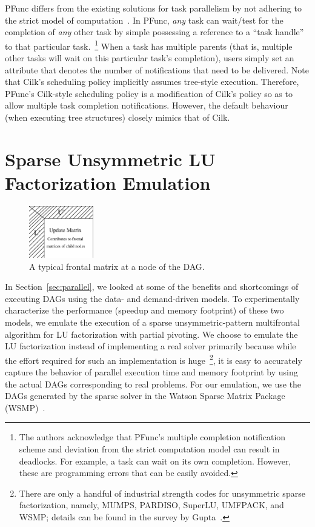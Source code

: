 \documentclass[10pt,conference]{IEEEtran}
\begin{document}
PFunc differs from the existing solutions for task parallelism by not adhering
to the strict model of computation~\cite{Blumofe94}.  In PFunc, \textit{any}
task can wait/test for the completion of \textit{any} other task by simple
possessing a reference to a ``task handle'' to that particular
task.~\footnote{The authors acknowledge that PFunc's multiple completion
notification scheme and deviation from the strict computation model can result
in deadlocks. For example, a task can wait on its own completion. However,
these are programming errors that can be easily avoided.} When a task has
multiple parents (that is, multiple other tasks will wait on this particular
task's completion), users simply set an attribute that denotes the number of
notifications that need to be delivered.  Note that Cilk's scheduling policy
implicitly assumes tree-style execution.  Therefore, PFunc's Cilk-style
scheduling policy is a modification of Cilk's policy so as to allow multiple
task completion notifications.  However, the default behaviour (when executing
tree structures) closely mimics that of Cilk.

\section{Sparse Unsymmetric LU Factorization Emulation}
\label{sec:lu}

\begin{figure}[t]
\centering
\includegraphics[width=0.25\textwidth]{figs/lu.eps}
\caption{A typical frontal matrix at a node of the DAG.}
\label{fig:lu}
\end{figure}

In Section~\ref{sec:parallel}, we looked at some of the benefits and
shortcomings of executing DAGs using the data- and demand-driven models. To
experimentally characterize the performance (speedup and memory footprint) of
these two models, we emulate the execution of a sparse unsymmetric-pattern
multifrontal algorithm for LU factorization with partial pivoting.  We choose
to emulate the LU factorization instead of implementing a real solver primarily
because while the effort required for such an implementation is 
huge~\footnote{There are only a handful of industrial strength codes for
unsymmetric sparse factorization, namely, MUMPS, PARDISO, SuperLU, UMFPACK, and
WSMP; details can be found in the survey by Gupta~\cite{GUPTAtoms01}.}, it is
easy to accurately capture the behavior of parallel execution time and memory
footprint by using the actual DAGs corresponding to real problems.  For our
emulation, we use the DAGs generated by the sparse solver in the Watson Sparse
Matrix Package (WSMP)~\cite{GUPTAsimax01,GUPTA00wsmp2}.
\end{document}
